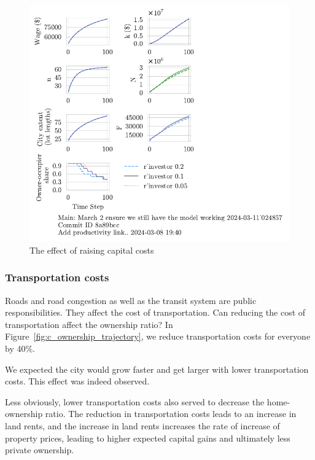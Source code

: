 \begin{figure}[h!t]
    \centering
    \includegraphics[scale=.8, trim={0 1.4cm 0 0},clip]{fig/r_investor-Main-024857.pdf}
    \caption{The effect of raising capital costs}
    \label{fig:capital_ownership_trajectory}
\end{figure}

\newpage
\subsubsection{Transportation costs}
Roads and road congestion as well as the transit system are public responsibilities. They affect the cost of transportation. Can reducing the cost of transportation affect the ownership ratio? In Figure~\ref{fig:c_ownership_trajectory}, we reduce transportation costs for everyone by 40\%. 

We expected the city would grow faster and get larger with lower transportation costs. This effect was indeed observed. 

Less obviously, lower transportation costs also served to decrease the home-ownership ratio. The reduction in transportation costs leads to an increase in land rents, and the increase in land rents increases the rate of increase of property prices, leading to higher expected capital gains and ultimately less private ownership. 




